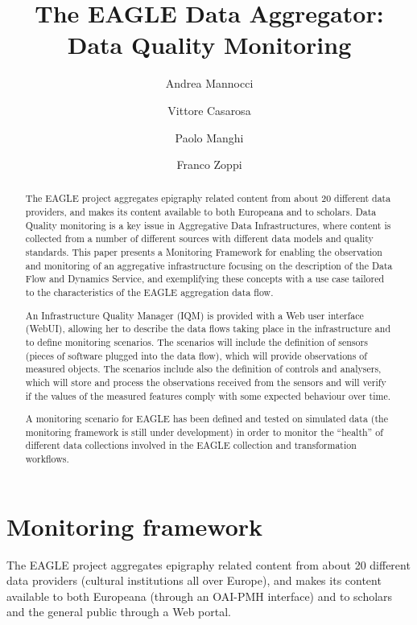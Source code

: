\documentclass[amsthm,ebook]{saparticle}
\title{The EAGLE Data Aggregator:
Data Quality Monitoring}
\author[CNR-ISTI]{Andrea Mannocci\corref{all}}
\author[CNR-ISTI]{Vittore Casarosa\corref{all}}
\author[CNR-ISTI]{Paolo Manghi\corref{all}}
\author[CNR-ISTI]{Franco Zoppi\corref{all}}
\begin{document}
\maketitle

\begin{abstract}
The EAGLE project aggregates epigraphy related content from about 20 different data providers, and makes its content available to both Europeana and to scholars. Data Quality monitoring is a key issue in Aggregative Data Infrastructures, where content is collected from a number of different sources with different data models and quality standards. This paper presents a Monitoring Framework for enabling the observation and monitoring of an aggregative infrastructure focusing on the description of the Data Flow and Dynamics Service, and exemplifying these concepts with a use case tailored to the characteristics of the EAGLE aggregation data flow.

An Infrastructure Quality Manager (IQM) is provided with a Web user interface (WebUI), allowing her to describe the data flows taking place in the infrastructure and to define monitoring scenarios. The scenarios will include the definition of sensors (pieces of software plugged into the data flow), which will provide observations of measured objects. The scenarios include also the definition of controls and analysers, which will store and process the observations received from the sensors and will verify if the values of the measured features comply with some expected behaviour over time. 

A monitoring scenario for EAGLE has been defined and tested on simulated data (the monitoring framework is still under development) in order to monitor the ``health'' of different data collections involved in the EAGLE collection and transformation workflows.  

\end{abstract}


\section{Monitoring framework}\label{framework}

The EAGLE project \citep[fully described in][]{eagle} aggregates epigraphy related content from about 20 different data providers (cultural institutions all over Europe), and makes its content available to both Europeana \citep{europeana} (through an OAI-PMH interface) and to scholars and the general public through a Web portal.
\end{document}
